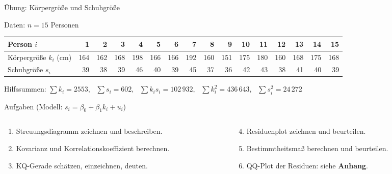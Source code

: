 \documentclass[aspectratio=169,11pt]{beamer}
\begin{document}
\begin{frame}{Übung: Körpergröße und Schuhgröße}
  \begin{block}{Daten: $n = 15$ Personen}
    \vspace{-4pt}
    \begin{center}
      \scriptsize
      \renewcommand{\arraystretch}{1.1}
      \setlength{\tabcolsep}{3.4pt}
      \begin{tabular}{l*{15}{r}}
        \toprule
        Person $i$         & 1 & 2 & 3 & 4 & 5 & 6 & 7 & 8 & 9 & 10 & 11 & 12 & 13 & 14 & 15 \\
        \midrule
        Körpergröße $k_i$ (cm) & 164 & 162 & 168 & 198 & 166 & 166 & 192 & 160 & 151 & 175 & 180 & 160 & 168 & 175 & 168 \\
        Schuhgröße $s_i$       & 39 & 38 & 39 & 46 & 40 & 39 & 45 & 37 & 36 & 42 & 43 & 38 & 41 & 40 & 39 \\
        \bottomrule
      \end{tabular}
    \end{center}
    \footnotesize Hilfssummen: $\sum k_i = 2553$, \ $\sum s_i = 602$, \
    $\sum k_i s_i = 102\,932$, \ $\sum k_i^{2} = 436\,643$, \ $\sum s_i^{2} = 24\,272$
  \end{block}

  \begin{exampleblock}{Aufgaben (Modell: $s_i = \beta_0 + \beta_1 k_i + u_i$)}
    \begin{columns}[T]
      \begin{column}{0.48\textwidth}
        \begin{enumerate}
          \item Streuungsdiagramm zeichnen und beschreiben.
          \item Kovarianz und Korrelationskoeffizient berechnen.
          \item KQ-Gerade schätzen, einzeichnen, deuten.
        \end{enumerate}
      \end{column}
      \begin{column}{0.5\textwidth}
        \begin{enumerate}
          \setcounter{enumi}{3}
          \item Residuenplot zeichnen und beurteilen.
          \item Bestimmtheitsmaß berechnen und beurteilen.
          \item QQ-Plot der Residuen: siehe \textbf{Anhang}.
        \end{enumerate}
      \end{column}
    \end{columns}
  \end{exampleblock}
\end{frame}
\end{document}
